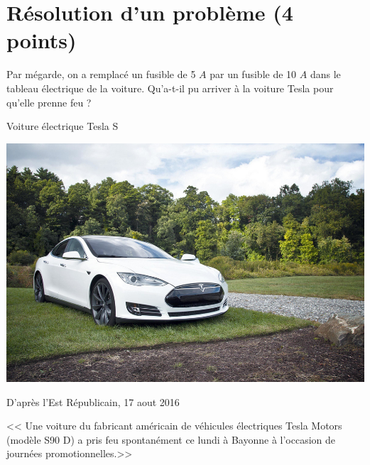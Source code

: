 \section{Résolution d'un problème (4 points)}

Par mégarde, on a remplacé un fusible de 5 $A$ par un fusible de 10 $A$ dans le tableau électrique de la voiture. Qu'a-t-il pu arriver à la voiture Tesla pour qu'elle prenne feu ?


	\begin{doc}[h!]
		\caption{Voiture électrique Tesla S\textregistered}
		
		\begin{center}
			\includegraphics[scale=0.35]{img/tesla}
		\end{center}
	\end{doc}
	
	\begin{doc}[h!]
		\caption{D'après l'Est Républicain, 17 aout 2016 }
		
		<< Une voiture du fabricant américain de véhicules électriques Tesla Motors (modèle S90 D) a pris feu spontanément ce lundi à Bayonne à l'occasion de journées promotionnelles.>>
	\end{doc}





